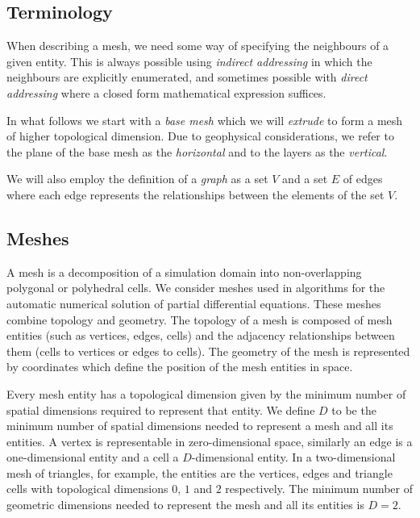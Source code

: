 \documentclass[11pt, a4paper]{scrartcl}
\begin{document}
\subsection{Terminology}
\label{ssec:mesh-terminology}
When describing a mesh, we need some way of specifying the neighbours
of a given entity.  This is always possible using \emph{indirect
  addressing} in which the neighbours are explicitly enumerated, and
sometimes possible with \emph{direct addressing} where a closed form
mathematical expression suffices.

In what follows we start with a \emph{base mesh} which we will
\emph{extrude} to form a mesh of higher topological dimension.  Due to
geophysical considerations, we refer to the plane of the base mesh as
the \emph{horizontal} and to the layers as the \emph{vertical}.

We will also employ the definition of a \emph{graph} as a set $V$ and
a set $E$ of edges where each edge represents the relationships
between the elements of the set $V$.

\subsection{Meshes}
\label{ssec:mesh-representation}

A mesh is a decomposition of a simulation domain into non-overlapping
polygonal or polyhedral cells. We consider meshes used in algorithms
for the automatic numerical solution of partial differential
equations. These meshes combine topology and geometry. The topology of
a mesh is composed of mesh entities (such as vertices, edges, cells)
and the adjacency relationships between them (cells to vertices or
edges to cells). The geometry of the mesh is represented by
coordinates which define the position of the mesh entities in space.

Every mesh entity has a topological dimension given by the minimum
number of spatial dimensions required to represent that entity. We
define $D$ to be the minimum number of spatial dimensions needed to
represent a mesh and all its entities. A vertex is representable in
zero-dimensional space, similarly an edge is a one-dimensional entity
and a cell a $D$-dimensional entity. In a two-dimensional mesh of
triangles, for example, the entities are the vertices, edges and
triangle cells with topological dimensions $0$, $1$ and $2$
respectively. The minimum number of geometric dimensions needed to
represent the mesh and all its entities is $D=2$.
\end{document}
